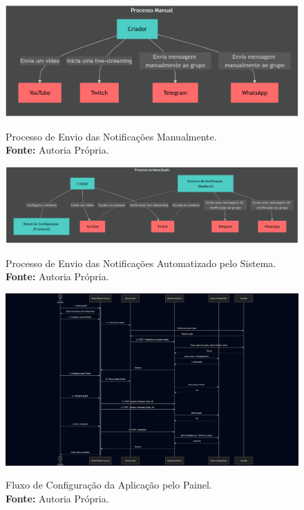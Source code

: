 \begin{figure}[!ht]
    \centering
    \caption{
        Processo de Envio das Notificações Manualmente.\\
        {\footnotesize\textbf{Fonte:} Autoria Própria.}
    }
    \includegraphics[width=1.0\linewidth]{img/processo manual.PNG}
    \label{fig:envio-manual}
\end{figure}

\begin{figure}[!ht]
    \centering
    \caption{
        Processo de Envio das Notificações Automatizado pelo Sistema.\\{\footnotesize\textbf{Fonte:} Autoria Própria.}
    }
    \includegraphics[width=1.0\textwidth]{img/processo automatizado.PNG}
    \label{fig:envio-automatizado}
\end{figure}

\begin{figure}[!ht]
    \caption{
        Fluxo de Configuração da Aplicação pelo Painel.\\
        {\footnotesize\textbf{Fonte:} Autoria Própria.}
    }
    \includegraphics[width=1.0\textwidth]{img/Fluxo de Configuração da Aplicação pelo Painel.png}
    \label{fig:painel-configuracao}
\end{figure}

